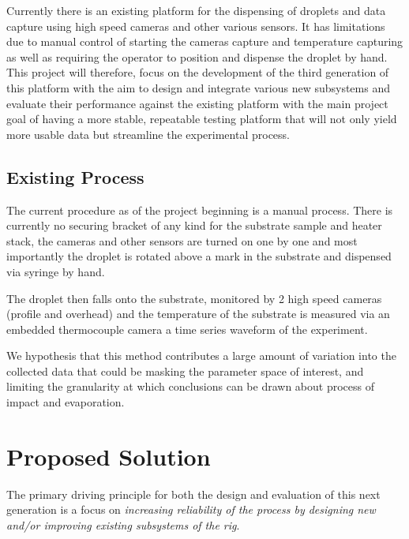 \documentclass[11pt, a4paper, twoside, openright]{report}
\begin{document}
Currently there is an existing platform for the dispensing of droplets and data capture using high speed cameras and other various sensors. It has limitations due to manual control of starting the cameras capture and temperature capturing as well as requiring the operator to position and dispense the droplet by hand. \\

This project will therefore, focus on the development of the third generation of this platform with the aim to design and integrate various new subsystems and evaluate their performance against the existing platform with the main project goal of having a more stable, repeatable testing platform that will not only yield more usable data but streamline the experimental process.

\subsection{Existing Process}
The current procedure as of the project beginning is a manual process. There is currently no securing bracket of any kind for the substrate sample and heater stack, the cameras and other sensors are turned on one by one and most importantly the droplet is rotated above a mark in the substrate and dispensed via syringe by hand.

The droplet then falls onto the substrate, monitored by 2 high speed cameras (profile and overhead) and the temperature of the substrate is measured via an embedded thermocouple camera a time series waveform of the experiment.

We hypothesis that this method contributes a large amount of variation into the collected data that could be masking the parameter space of interest, and limiting the granularity at which conclusions can be drawn about process of impact and evaporation.

\newpage
\section{Proposed Solution}
The primary driving principle for both the design and evaluation of this next generation is a focus on \textit{increasing reliability of the process by designing new and/or improving existing subsystems of the rig}. 
\end{document}
